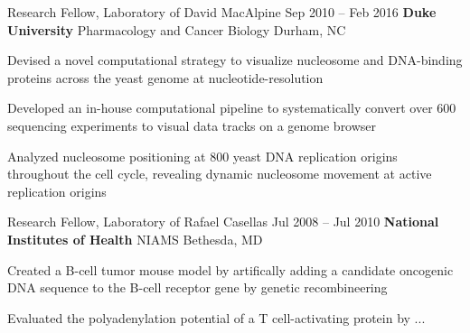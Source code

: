 
\begin{resentries}

  \resentry
    {Research Fellow, Laboratory of David MacAlpine}
    {Sep 2010 -- Feb 2016}
    {\textbf{Duke University} \xspace \bullet \xspace \xspace Pharmacology and Cancer Biology} %
    {Durham, NC} %
    {
      \begin{cvitems} %
        \item{Devised a novel computational strategy to visualize nucleosome and DNA-binding proteins across the yeast genome at nucleotide-resolution}
        \item{Developed an in-house computational pipeline to systematically convert over 600 sequencing experiments to visual data tracks on a genome browser}
        \item{Analyzed nucleosome positioning at 800 yeast DNA replication origins throughout the cell cycle, revealing dynamic nucleosome movement at active replication origins}
      \end{cvitems}
    }

  \resentry
    {Research Fellow, Laboratory of Rafael Casellas}
    {Jul 2008 -- Jul 2010}
    {\textbf{National Institutes of Health} \xspace \bullet \xspace \xspace NIAMS}
    {Bethesda, MD}
    {
      \begin{cvitems} %
        \item{Created a B-cell tumor mouse model by artifically adding a candidate oncogenic DNA sequence to the B-cell receptor gene by genetic recombineering}
        \item{Evaluated the polyadenylation potential of a T cell-activating protein by ...}
      \end{cvitems}
    }

\end{resentries}
\vspace{-2mm}
